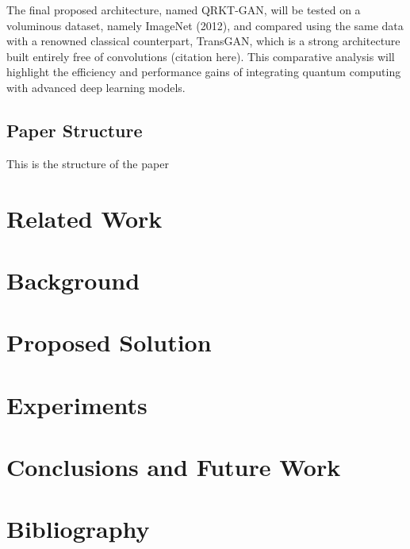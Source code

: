 \documentclass[12pt,a4paper]{report}
\begin{document}
The final proposed architecture, named QRKT-GAN, will be tested on a voluminous dataset, namely ImageNet (2012), and compared using the same data with a renowned classical counterpart, TransGAN, which is a strong architecture built entirely free of convolutions (citation here). This comparative analysis will highlight the efficiency and performance gains of integrating quantum computing with advanced deep learning models.
\section{Paper Structure}\vspace{-15pt}
This is the structure of the paper

\chapter{Related Work}\pagestyle{fancy}

\chapter{Background}\pagestyle{fancy}

\chapter{Proposed Solution}\pagestyle{fancy}

\chapter{Experiments}\pagestyle{fancy}

\chapter{Conclusions and Future Work}\pagestyle{fancy}

\chapter{Bibliography}\pagestyle{fancy}



\begingroup
\def\chapter*#1{}

\endgroup
\end{document}
